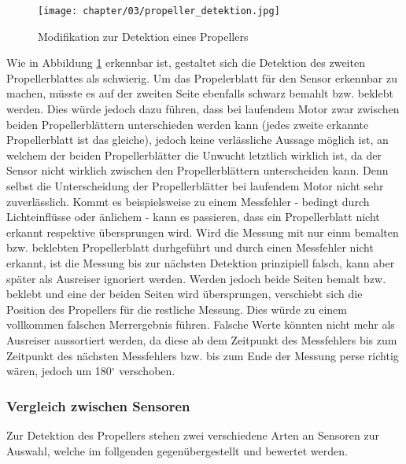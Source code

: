 \begin{figure}[h]
	\centering
	\texttt{[image: chapter/03/propeller\_detektion.jpg]}
	\caption{Modifikation zur Detektion eines Propellers}
	\label{fig:propeller_detektion}
\end{figure}
Wie in Abbildung \ref{fig:propeller_detektion} erkennbar ist, gestaltet sich die Detektion des zweiten Propellerblattes als schwierig. 
Um das Propelerblatt für den Sensor erkennbar zu machen, müsste es auf der zweiten Seite ebenfalls schwarz bemahlt bzw. beklebt werden.
Dies würde jedoch dazu führen, dass bei laufendem Motor zwar zwischen beiden Propellerblättern unterschieden werden kann (jedes zweite erkannte Propellerblatt ist das gleiche), jedoch keine verlässliche Aussage möglich ist, an welchem der beiden Propellerblätter die Unwucht letztlich wirklich ist, da der Sensor nicht wirklich zwischen den Propellerblättern unterscheiden kann.
Denn selbst die Unterscheidung der Propellerblätter bei laufendem Motor nicht sehr zuverlässlich.
Kommt es beispielsweise zu einem Messfehler - bedingt durch Lichteinflüsse oder änlichem - kann es passieren, dass ein Propellerblatt nicht erkannt respektive übersprungen wird.
Wird die Messung mit nur einm bemalten bzw. beklebten Propellerblatt durhgeführt und durch einen Messfehler nicht erkannt, ist die Messung bis zur nächsten Detektion prinzipiell falsch, kann aber später als Ausreiser ignoriert werden.
Werden jedoch beide Seiten bemalt bzw. beklebt und eine der beiden Seiten wird übersprungen, verschiebt sich die Position des Propellers für die restliche Messung.
Dies würde zu einem vollkommen falschen Merrergebnis führen.
Falsche Werte könnten nicht mehr als Ausreiser aussortiert werden, da diese ab dem Zeitpunkt des Messfehlers bis zum Zeitpunkt des nächsten Messfehlers bzw. bis zum Ende der Messung perse richtig wären, jedoch um 180$^\circ$ verschoben.

\subsubsection*{Vergleich zwischen Sensoren}
Zur Detektion des Propellers stehen zwei verschiedene Arten an Sensoren zur Auswahl, welche im follgenden gegenübergestellt und bewertet werden.

